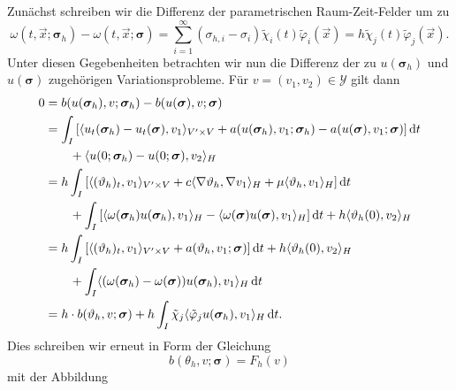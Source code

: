 \documentclass[../main.tex]{subfiles}
\begin{document}
\begin{Satz}
\begin{Beweis}
        Zunächst schreiben wir die Differenz der parametrischen Raum-Zeit-Felder um zu
        \begin{equation}
            \omega(t, \vec{x}; \bm\sigma_{h}) - \omega(t, \vec{x}; \bm\sigma)
            = \sum_{i = 1}^{\infty} (\sigma_{h,i} - \sigma_{i} ) \tilde{\chi}_{i}(t) \tilde{\varphi}_{i}(\vec{x})
            = h \tilde{\chi}_{j}(t) \tilde{\varphi}_{j}(\vec{x}).
        \end{equation}
        Unter diesen Gegebenheiten betrachten wir nun die Differenz der zu $u(\bm\sigma_{h})$ und $u(\bm\sigma)$ zugehörigen Variationsprobleme.
        Für $v = (v_{1}, v_{2}) \in \mathcal Y$ gilt dann
        \begin{align}
            0
            &= b(u(\bm\sigma_{h}), v; \bm\sigma_{h}) - b(u(\bm\sigma), v; \bm\sigma)
            \\&= \int_{I} \left[ \langle u_{t}(\bm\sigma_{h}) - u_{t}(\bm\sigma),v_{1}\rangle_{V' \times V} + a(u(\bm\sigma_{h}), v_{1}; \bm\sigma_{h}) - a(u(\bm\sigma), v_{1}; \bm\sigma) \right] \mathop{}\!\mathrm{d} t
            \\&\qquad + \langle u(0; \bm\sigma_{h}) - u(0; \bm\sigma),v_{2}\rangle_{H}
            \\&=  h \int_{I} \left[ \langle(\vartheta_{h})_{t},v_{1}\rangle_{V' \times V} + c\langle\nabla \vartheta_{h},\nabla v_{1}\rangle_{H}  +  \mu \langle\vartheta_{h},v_{1}\rangle_{H} \right] \mathop{}\!\mathrm{d} t
            \\&\qquad + \int_{I} \left[ \langle\omega(\bm\sigma_{h}) u(\bm\sigma_{h}),v_{1}\rangle_{H} - \langle\omega(\bm\sigma) u(\bm\sigma),v_{1}\rangle_{H}  \right] \mathop{}\!\mathrm{d} t + h \langle\vartheta_{h}(0),v_{2}\rangle_{H}
            \\&= h \int_{I} \left[ \langle(\vartheta_{h})_{t},v_{1}\rangle_{V' \times V} + a(\vartheta_{h}, v_{1}; \bm\sigma)  \right] \mathop{}\!\mathrm{d} t + h \langle\vartheta_{h}(0),v_{2}\rangle_{H}
            \\&\qquad +\int_{I} \langle(\omega(\bm\sigma_{h}) - \omega(\bm\sigma))u(\bm\sigma_{h}),v_{1}\rangle_{H} \mathop{}\!\mathrm{d} t
            \\&= h \cdot b(\vartheta_{h}, v; \bm\sigma) + h \int_{I} \tilde{\chi}_{j} \langle\tilde{\varphi}_{j} u(\bm\sigma_{h}),v_{1}\rangle_{H} \mathop{}\!\mathrm{d} t.
        \end{align}
        Dies schreiben wir erneut in Form der Gleichung
        \begin{equation}
            \label{eq:existenz_partieller_ableitungen:beweis:variationsproblem}
            b(\theta_{h}, v; \bm\sigma) = F_{h}(v)
        \end{equation}
        mit der Abbildung
        \begin{equation}

\end{equation}
\end{Beweis}
\end{Satz}
\end{document}
